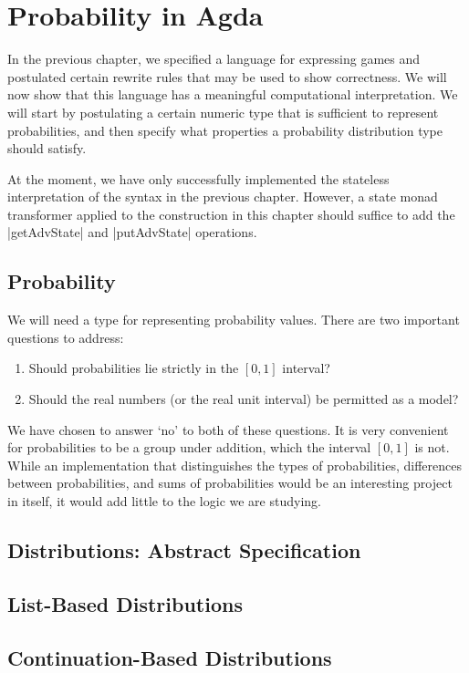 \chapter{Probability in Agda}

In the previous chapter, we specified a language for expressing games and postulated certain rewrite rules that may be
used to show correctness.  We will now show that this language has a meaningful computational interpretation.  We will
start by postulating a certain numeric type that is sufficient to represent probabilities, and then specify what
properties a probability distribution type should satisfy.

At the moment, we have only successfully implemented the stateless interpretation of the syntax in the previous chapter.
However, a state monad transformer applied to the construction in this chapter should suffice to add the |getAdvState|
and |putAdvState| operations.

\section{Probability}

We will need a type for representing probability values.  There are two important questions to address:
\begin{enumerate}
    \item Should probabilities lie strictly in the $[0, 1]$ interval?
    \item Should the real numbers (or the real unit interval) be permitted as a model?
\end{enumerate}

We have chosen to answer `no' to both of these questions.  It is very convenient for probabilities to be a group under
addition, which the interval $[0, 1]$ is not.  While an implementation that distinguishes the types of probabilities,
differences between probabilities, and sums of probabilities would be an interesting project in itself, it would add
little to the logic we are studying.


\section{Distributions: Abstract Specification}

\section{List-Based Distributions}

\section{Continuation-Based Distributions}



